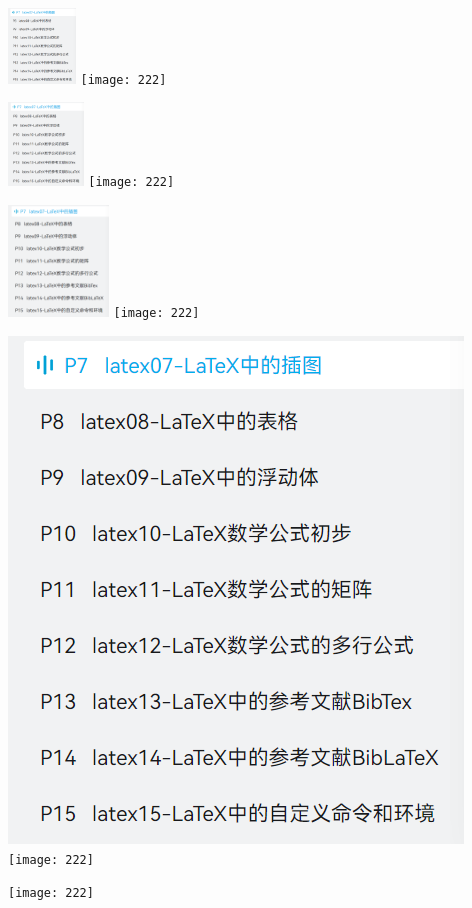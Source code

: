 \documentclass{article}
\begin{document}
    \includegraphics[height=2cm]{111}
    \texttt{[image: 222]}

    \includegraphics[width=2cm]{111}
    \texttt{[image: 222]}

    \includegraphics[width=0.2\textwidth]{111}
    \texttt{[image: 222]}

    \includegraphics[angle=-45,width=0.1\textheight]{111}
    \texttt{[image: 222]}

    \texttt{[image: 222]}
\end{document}
